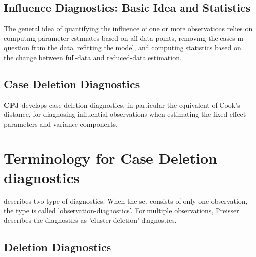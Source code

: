 \documentclass[Main.tex]{subfiles}
\begin{document}
	
	
	\subsection{Influence Diagnostics: Basic Idea and Statistics} %
	
	The general idea of quantifying the influence of one or more observations relies on computing parameter estimates based on all data points, removing the cases in question from the data, refitting the model, and computing statistics based on the change between full-data and reduced-data estimation. 
	

	\subsection{Case Deletion Diagnostics} %
	
	\textbf{CPJ} develops  case deletion diagnostics, in particular the equivalent of  Cook's distance, for diagnosing influential observations when estimating the fixed effect parameters and variance components.
	
	
	
	
	
	
	\newpage
	\section{Terminology for Case Deletion diagnostics} %
	
	\citet{preisser} describes two type of diagnostics. When the set consists of only one observation, the type is called
	'observation-diagnostics'. For multiple observations, Preisser describes the diagnostics as 'cluster-deletion' diagnostics.
	
	
	\subsection{Deletion Diagnostics}
	
\end{document}
